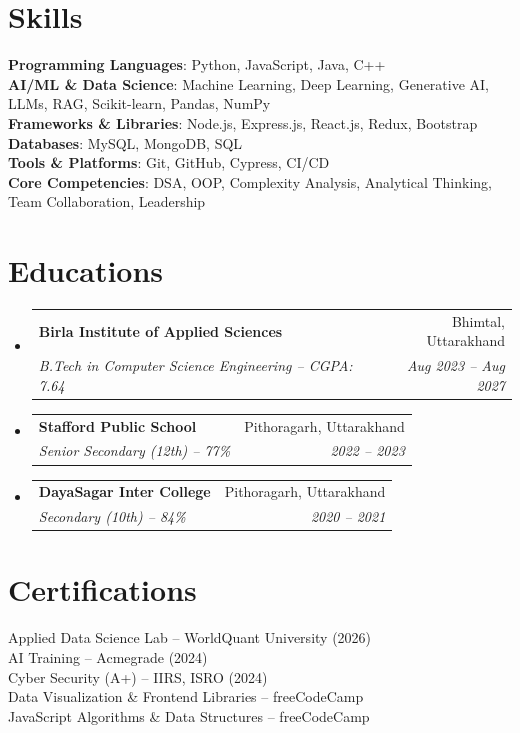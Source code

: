 \documentclass[letterpaper,11pt]{article}
\makeatletter
\newcommand{\resumeSubheading}[4]{
  \vspace{-2pt}\item
    \begin{tabular*}{0.97\textwidth}[t]{l@{\extracolsep{\fill}}r}
      \textbf{#1} & #2 \\
      \textit{\small#3} & \textit{\small #4} \\
    \end{tabular*}\vspace{-7pt}
}
\newcommand{\resumeSubHeadingListStart}{\begin{itemize}[leftmargin=0.15in, label={}]}
\newcommand{\resumeSubHeadingListEnd}{\end{itemize}}
\makeatother
\begin{document}
\section{Skills}
 \begin{itemize}[leftmargin=0.15in, label={}]
    \small{\item{
     \textbf{Programming Languages}{: Python, JavaScript, Java, C++} \\
     \textbf{AI/ML \& Data Science}{: Machine Learning, Deep Learning, Generative AI, LLMs, RAG, Scikit-learn, Pandas, NumPy} \\
     \textbf{Frameworks \& Libraries}{: Node.js, Express.js, React.js, Redux, Bootstrap} \\
     \textbf{Databases}{: MySQL, MongoDB, SQL} \\
     \textbf{Tools \& Platforms}{: Git, GitHub, Cypress, CI/CD} \\
     \textbf{Core Competencies}{: DSA, OOP, Complexity Analysis, Analytical Thinking, Team Collaboration, Leadership}
    }}
 \end{itemize}

\section{Educations}
  \resumeSubHeadingListStart
    \resumeSubheading
      {Birla Institute of Applied Sciences}{Bhimtal, Uttarakhand}
      {B.Tech in Computer Science Engineering -- CGPA: 7.64}{Aug 2023 -- Aug 2027}

    \resumeSubheading
      {Stafford Public School}{Pithoragarh, Uttarakhand}
      {Senior Secondary (12th) -- 77\%}{2022 -- 2023}

    \resumeSubheading
      {DayaSagar Inter College}{Pithoragarh, Uttarakhand}
      {Secondary (10th) -- 84\%}{2020 -- 2021}
  \resumeSubHeadingListEnd

\section{Certifications}
 \begin{itemize}[leftmargin=0.15in, label={}]
    \small{\item{
     Applied Data Science Lab -- WorldQuant University (2026) \\
     AI Training -- Acmegrade (2024) \\
     Cyber Security (A+) -- IIRS, ISRO (2024) \\
     Data Visualization \& Frontend Libraries -- freeCodeCamp \\
     JavaScript Algorithms \& Data Structures -- freeCodeCamp
    }}
 \end{itemize}
\end{document}
